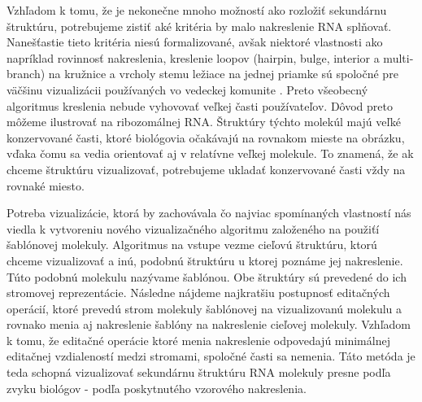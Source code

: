Vzhľadom k tomu, že je nekonečne mnoho možností ako rozložiť sekundárnu štruktúru,
potrebujeme zistiť aké kritéria by malo nakreslenie RNA splňovať. Nanešťastie
tieto kritéria niesú formalizované, avšak niektoré vlastnosti ako napríklad
rovinnosť nakreslenia, kreslenie loopov (hairpin, bulge, interior a multi-branch)
na kružnice a vrcholy stemu ležiace na jednej priamke sú spoločné pre väčšinu
vizualizácii používaných vo vedeckej komunite .
Preto všeobecný algoritmus kreslenia nebude vyhovovať veľkej časti používateľov.
Dôvod preto môžeme ilustrovať na ribozomálnej RNA. Štruktúry týchto molekúl
majú veľké konzervované časti, ktoré biológovia očakávajú na rovnakom mieste
na obrázku, vďaka čomu sa vedia orientovať aj v relatívne veľkej molekule.
To znamená, že ak chceme štruktúru vizualizovať, potrebujeme ukladať
konzervované časti vždy na rovnaké miesto.

Potreba vizualizácie, ktorá by zachovávala čo najviac spomínaných vlastností
nás viedla k vytvoreniu nového vizualizačného algoritmu založeného na
použiťí šablónovej molekuly. Algoritmus na vstupe vezme cieľovú štruktúru,
ktorú chceme vizualizovať a inú, podobnú štruktúru u ktorej poznáme jej
nakreslenie. Túto podobnú molekulu nazývame šablónou. Obe štruktúry sú
prevedené do ich stromovej reprezentácie. Následne nájdeme najkratšiu postupnosť
editačných operácií, ktoré prevedú strom molekuly šablónovej na vizualizovanú
molekulu a rovnako menia aj nakreslenie šablóny na nakreslenie cieľovej molekuly.
Vzhľadom k tomu, že editačné operácie ktoré menia nakreslenie odpovedajú
minimálnej editačnej vzdialeností medzi stromami, spoločné časti sa nemenia.
Táto metóda je teda schopná vizualizovať sekundárnu štruktúru RNA
molekuly presne podľa zvyku biológov - podľa poskytnutého vzorového
nakreslenia.


